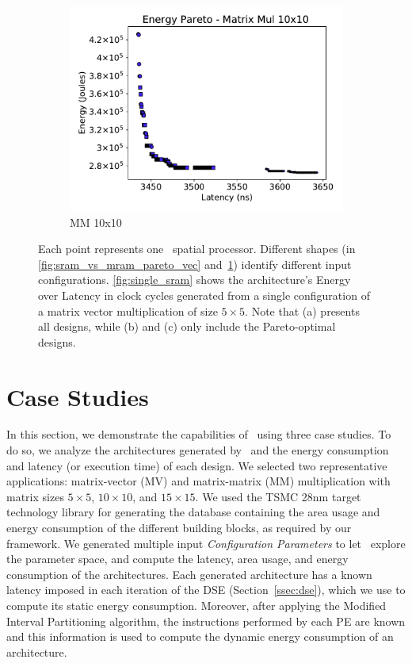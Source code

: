 \begin{figure}[ht]
\begin{subfigure}{.33\textwidth}
  \includegraphics[width=\textwidth]{graphs/EnergyParetoMatrixMul10_v3.pdf}
  \caption{MM 10x10}
  \label{fig:sram_vs_mram_pareto_mul}
\end{subfigure}
    \caption{\small Each point represents one \frameworkname~spatial processor. Different shapes (in \ref{fig:sram_vs_mram_pareto_vec} and~\ref{fig:sram_vs_mram_pareto_mul}) identify different input configurations. \ref{fig:single_sram} shows the architecture's Energy over Latency in clock cycles generated from a single configuration of a matrix vector multiplication of size $5\times5$. Note that (a) presents all designs, while (b) and (c) only include the Pareto-optimal designs.}
\label{fig:case_studies_1}
\end{figure}
\section{Case Studies}
\label{sec:case_studies}
In this section, we demonstrate the capabilities of \frameworkname~using three case studies. To do so, we analyze the architectures generated by \frameworkname~and the energy consumption and latency (or execution time) of each design.
We selected two representative applications: matrix-vector (MV) and matrix-matrix (MM) multiplication with matrix sizes $5\times5$, $10\times10$, and $15\times15$. We used the TSMC 28nm target technology library for generating the database containing the area usage and energy consumption of the different building blocks, as required by our framework.
We generated multiple input \textit{Configuration Parameters} to let \frameworkname~explore the parameter space, and compute the latency, area usage, and energy consumption of the architectures. Each generated architecture has a known latency imposed in each iteration of the DSE (Section~\ref{ssec:dse}), which we use to compute its static energy consumption. Moreover, after applying the Modified Interval Partitioning algorithm, the instructions performed by each PE are known and this information is used to compute the dynamic energy consumption of an architecture.

